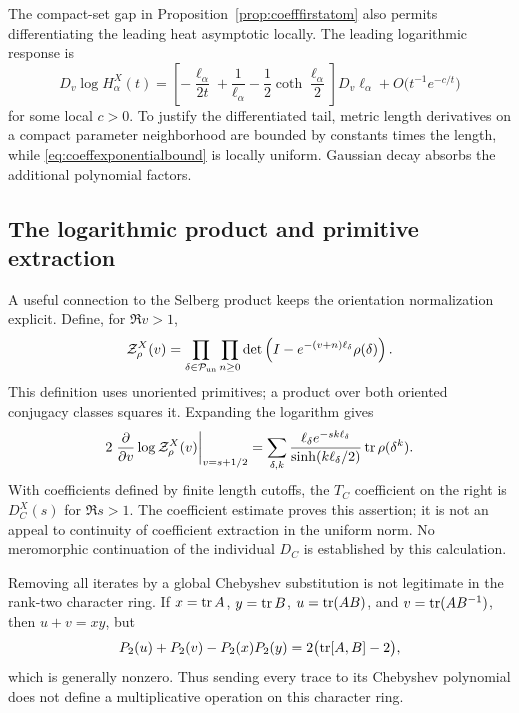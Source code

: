The compact-set gap in Proposition~\ref{prop:coefffirstatom} also
permits differentiating the leading heat asymptotic locally.
The leading logarithmic response is
\begin{equation}
 D_v\log H_\alpha^X(t)
 =\left[-\frac{\ell_\alpha}{2t}
          +\frac1{\ell_\alpha}
          -\frac12\coth\frac{\ell_\alpha}{2}\right]
    D_v\ell_\alpha
  +O\bigl(t^{-1}e^{-c/t}\bigr)
 \label{eq:coeffheatvariation}
\end{equation}
for some local $c>0$. To justify the differentiated tail, metric
length derivatives on a compact parameter neighborhood are bounded
by constants times the length, while
\eqref{eq:coeffexponentialbound} is locally uniform. Gaussian
decay absorbs the additional polynomial factors.

\subsection{The logarithmic product and primitive extraction}

A useful connection to the Selberg product keeps the orientation
normalization explicit. Define, for $\Re v>1$,
\begin{equation}
 \mathcal Z_\rho^X(v)
 =\prod_{\delta\in\mathcal P_{\rm un}}\prod_{n\geq0}
 \det\left(I-e^{-(v+n)\ell_\delta}\rho(\delta)\right).
 \label{eq:coeffunorientedproduct}
\end{equation}
This definition uses unoriented primitives; a product over both
oriented conjugacy classes squares it. Expanding the logarithm gives
\begin{equation}
 2\left.\frac{\partial}{\partial v}
     \log\mathcal Z_\rho^X(v)\right|_{v=s+1/2}
 =\sum_{\delta,k}
   \frac{\ell_\delta e^{-sk\ell_\delta}}
        {\sinh(k\ell_\delta/2)}\operatorname{tr}\rho(\delta^k).
 \label{eq:coeffproductderivative}
\end{equation}
With coefficients defined by finite length cutoffs, the $T_C$
coefficient on the right is $D_C^X(s)$ for $\Re s>1$.
The coefficient estimate proves this assertion; it is not an
appeal to continuity of coefficient extraction in the uniform norm.
No meromorphic continuation of the individual $D_C$ is established
by this calculation.

Removing all iterates by a global Chebyshev substitution is not
legitimate in the rank-two character ring. If
$x=\operatorname{tr} A$, $y=\operatorname{tr} B$, $u=\operatorname{tr}(AB)$, and $v=\operatorname{tr}(AB^{-1})$,
then $u+v=xy$, but
\begin{equation}
 P_2(u)+P_2(v)-P_2(x)P_2(y)
 =2\bigl(\operatorname{tr}[A,B]-2\bigr),
 \label{eq:coeffAdamsobstruction}
\end{equation}
which is generally nonzero. Thus sending every trace to its
Chebyshev polynomial does not define a multiplicative operation
on this character ring.

